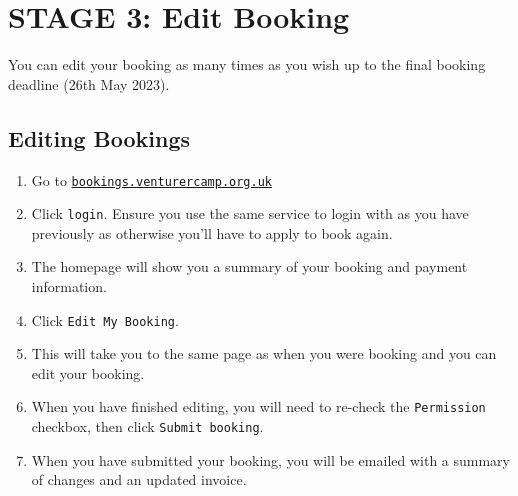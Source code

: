 \chapter{STAGE 3: Edit Booking}
\label{chap:edit}

You can edit your booking as many times as you wish up to the final booking deadline (26th May 2023). 

\section{Editing Bookings}
\begin{enumerate}
    \item Go to \href{https://bookings.venturercamp.org.uk}{\texttt{bookings.venturercamp.org.uk}}
    \item Click \verb|login|. Ensure you use the same service to login with as you have previously as otherwise you'll have to apply to book again.
    \item The homepage will show you a summary of your booking and payment information.
    \item Click \verb|Edit My Booking|.
    \item This will take you to the same page as when you were booking and you can edit your booking.
    \item When you have finished editing, you will need to re-check the \verb|Permission| checkbox, then click \verb|Submit booking|.
    \item When you have submitted your booking, you will be emailed with a summary of changes and an updated invoice.
\end{enumerate}